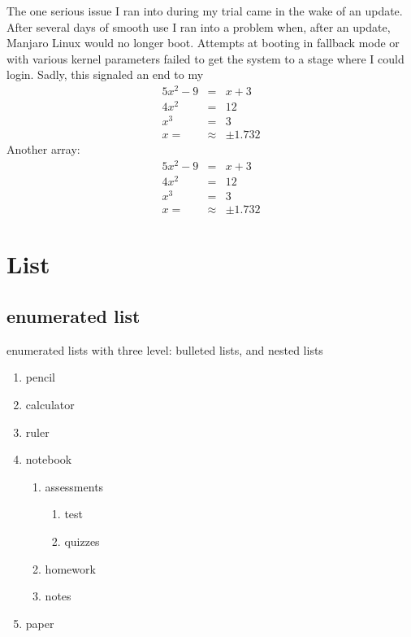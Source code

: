 \documentclass[11pt]{article}
\begin{document}
The one serious issue I ran into during my trial came in the wake of an update. After several days of smooth use I ran into a problem when, after an update, Manjaro Linux would no longer boot. Attempts at booting in fallback mode or with various kernel parameters failed to get the system to a stage where I could login. Sadly, this signaled an end to my\\
\begin{eqnarray}
5x^2 - 9 &=& x + 3\\
4x^2 &=& 12\\
x^3&=&3\\
x=&\approx&\pm1.732
\end{eqnarray}
Another array: \\
\begin{eqnarray*}
5x^2 - 9 &=& x + 3\\
4x^2 &=& 12\\
x^3&=&3\\
x=&\approx&\pm1.732
\end{eqnarray*}

\section{List}
	\subsection{enumerated list}
enumerated lists with three level: bulleted lists, and nested lists
\begin{enumerate}
	\item pencil
	\item calculator
	\item ruler
	\item notebook
		\begin{enumerate}
			\item assessments
			\begin{enumerate}
				\item test
				\item quizzes
			\end{enumerate}
			\item homework
			\item notes
		\end{enumerate}
	\item paper
\end{enumerate}
\end{document}
